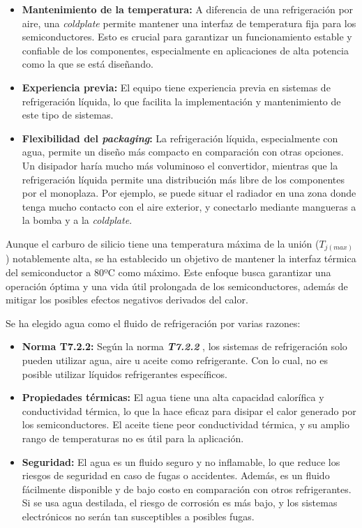 \begin{itemize}
	\item \textbf{Mantenimiento de la temperatura:} A diferencia de una refrigeración por aire, una \textit{coldplate} permite mantener una interfaz de temperatura fija para los semiconductores. Esto es crucial para garantizar un funcionamiento estable y confiable de los componentes, especialmente en aplicaciones de alta potencia como la que se está diseñando.
	
	\item \textbf{Experiencia previa:} El equipo tiene experiencia previa en sistemas de refrigeración líquida, lo que facilita la implementación y mantenimiento de este tipo de sistemas.
	
	\item \textbf{Flexibilidad del \textit{packaging}:} La refrigeración líquida, especialmente con agua, permite un diseño más compacto en comparación con otras opciones. Un disipador haría mucho más voluminoso el convertidor, mientras que la refrigeración líquida permite una distribución más libre de los componentes por el monoplaza. Por ejemplo, se puede situar el radiador en una zona donde tenga mucho contacto con el aire exterior, y conectarlo mediante mangueras a la bomba y a la \textit{coldplate}.
	
	
\end{itemize}

Aunque el carburo de silicio tiene una temperatura máxima de la unión (\(T_{j(max)}\)) notablemente alta, se ha establecido un objetivo de mantener la interfaz térmica del semiconductor a 80ºC como máximo. Este enfoque busca garantizar una operación óptima y una vida útil prolongada de los semiconductores, además de mitigar los posibles efectos negativos derivados del calor.

Se ha elegido agua como el fluido de refrigeración por varias razones:

\begin{itemize}
	\item \textbf{Norma T7.2.2:} Según la norma \textbf{\textit{T7.2.2}} \cite{FSG}, los sistemas de refrigeración solo pueden utilizar agua, aire u aceite como refrigerante. Con lo cual, no es posible utilizar líquidos refrigerantes específicos.
	
	\item \textbf{Propiedades térmicas:} El agua tiene una alta capacidad calorífica y conductividad térmica, lo que la hace eficaz para disipar el calor generado por los semiconductores. El aceite tiene peor conductividad térmica, y su amplio rango de temperaturas no es útil para la aplicación.
	
	\item \textbf{Seguridad:} El agua es un fluido seguro y no inflamable, lo que reduce los riesgos de seguridad en caso de fugas o accidentes. Además, es un fluido fácilmente disponible y de bajo costo en comparación con otros refrigerantes. Si se usa agua destilada, el riesgo de corrosión es más bajo, y los sistemas electrónicos no serán tan susceptibles a posibles fugas.
	
\end{itemize}

